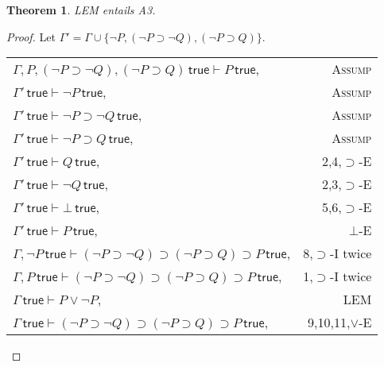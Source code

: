 \documentclass{article}
\newcounter{rowcount}
\newtheorem{theorem}{Theorem}[section]
\newcommand{\true}{\,\textsf{true}}
\begin{document}
\begin{theorem}
    \emph{LEM} entails \emph{A3}.
\end{theorem}
\setcounter{rowcount}{0}
\begin{proof}
    Let $\Gamma' = \Gamma \cup\{\neg P, (\neg P \supset \neg Q), (\neg P \supset Q)\}$.

    \begin{tabular}{@{\stepcounter{rowcount}\therowcount. }lr}
        $\Gamma, P, (\neg P \supset \neg Q), (\neg P \supset Q)\true \vdash P \true $,                & \textsc{Assump}     \\
        $\Gamma'\true \vdash \neg P\true$,                                                            & \textsc{Assump}     \\
        $\Gamma'\true \vdash \neg P \supset \neg Q\true$,                                             & \textsc{Assump}     \\
        $\Gamma'\true \vdash \neg P \supset Q\true$,                                                  & \textsc{Assump}     \\
        $\Gamma'\true \vdash Q\true$,                                                                 & 2,4,$\supset$-E     \\
        $\Gamma'\true \vdash \neg Q\true$,                                                            & 2,3,$\supset$-E     \\
        $\Gamma'\true \vdash \bot\true$,                                                              & 5,6,$\supset$-E     \\
        $\Gamma'\true \vdash P\true$,                                                                 & $\bot$-E            \\
        $\Gamma, \neg P\true \vdash (\neg P \supset \neg Q)\supset (\neg P \supset Q)\supset P\true$, & 8,$\supset$-I twice \\
        $\Gamma, P\true \vdash (\neg P \supset \neg Q)\supset (\neg P \supset Q)\supset P\true$,      & 1,$\supset$-I twice \\
        $\Gamma \true \vdash P\lor \neg P$,                                                           & LEM                 \\
        $\Gamma \true \vdash (\neg P \supset \neg Q)\supset (\neg P \supset Q)\supset P\true$,        & 9,10,11,$\lor$-E    \\
    \end{tabular}
\end{proof}
\end{document}
